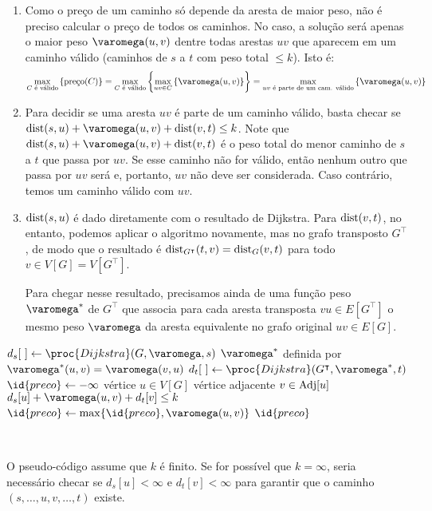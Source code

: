 \begin{enumerate}
    \item Como o preço de um caminho só depende da aresta de maior peso, não é preciso calcular o preço de todos os caminhos. No caso, a solução será apenas o maior peso $\varomega(u, v)$ dentre todas arestas $u v$ que aparecem em um caminho válido (caminhos de $s$ a $t$ com peso total $\leq k$). Isto é:
    \[
        \max_{C\text{ é válido}}\set{\text{preço}(C)}
        = \max_{C\text{ é válido}} \set{\max_{u v \in C}\set{\varomega(u, v)}}
        = \max_{u v\text{ é parte de um cam. válido}} \set{\varomega(u, v)}
    \]

    \item Para decidir se uma aresta $u v$ é parte de um caminho válido, basta checar se \\ $\dist(s, u) + \varomega(u, v) + \dist(v, t) \leq k$. Note que $\dist(s, u) + \varomega(u, v) + \dist(v, t)$ é o peso total do menor caminho de $s$ a $t$ que passa por $u v$. Se esse caminho não for válido, então nenhum outro que passa por $u v$ será e, portanto, $u v$ não deve ser considerada. Caso contrário, temos um caminho válido com $u v$.

    \item $\operatorname{dist}(s, u)$ é dado diretamente com o resultado de Dijkstra. Para $\operatorname{dist}(v, t)$, no entanto, podemos aplicar o algoritmo novamente, mas no grafo transposto $G^\intercal$, de modo que o resultado é $\operatorname{dist}_{G^\intercal}(t, v) = \operatorname{dist}_{G}(v, t)$ para todo $v \in V[G] = V[G^\intercal]$.

    Para chegar nesse resultado, precisamos ainda de uma função peso $\varomega^*$ de $G^\intercal$ que associa para cada aresta transposta $v u \in E[G^\intercal]$ o mesmo peso $\varomega$ da aresta equivalente no grafo original $u v \in E[G]$.
\end{enumerate}

\begin{codebox}

    \li $d_s[~] \Recebe \proc{Dijkstra}(G, \varomega, s)$
    \li \Seja $\varomega^*$ definida por $\varomega^*(u, v) = \varomega(v, u)$
    \li $d_t[~] \Recebe \proc{Dijkstra}(G^\intercal, \varomega^*, t)$
    \li
    \li $\id{preco} \Recebe -\infty$
    \li \Para \Cada vértice $u \in V[G]$ \Faca
        \Do
    \li     \Para \Cada vértice adjacente $v \in \operatorname{Adj}[u]$ \Faca
            \Do
    \li         \Se $d_s[u] + \varomega(u, v) + d_t[v] \leq k$
                \Do
    \li             \Entao $\id{preco} \Recebe \max\{\id{preco}, \varomega(u, v)\}$
                \End
            \End
        \End
    \li \Devolva $\id{preco}$
\end{codebox}

~

O pseudo-código assume que $k$ é finito. Se for possível que $k = \infty$, seria necessário checar se $d_s[u] < \infty$ e $d_t[v] < \infty$ para garantir que o caminho $(s, \ldots, u, v, \ldots, t)$ existe.
